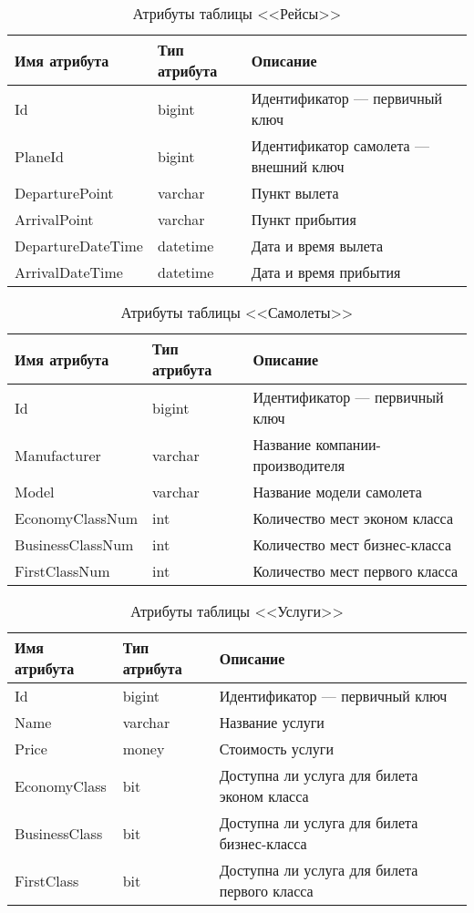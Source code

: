 \documentclass{bmstu}
\begin{document}
\begin{table}[H]
\caption{Атрибуты таблицы <<Рейсы>>}
\label{tabular:flights}
\begin{tabular}{|>{\raggedleft}p{4cm}|>{\raggedleft}p{3cm}|>{\raggedleft}p{8cm}|}
\hline
\textbf{Имя атрибута} & \textbf{Тип атрибута} & \textbf{Описание}
\tabularnewline
\hline
Id & bigint & Идентификатор --- первичный ключ
\tabularnewline
\hline
PlaneId & bigint & Идентификатор самолета --- внешний ключ
\tabularnewline
\hline
DeparturePoint & varchar & Пункт вылета
\tabularnewline
\hline
ArrivalPoint & varchar & Пункт прибытия
\tabularnewline
\hline
DepartureDateTime & datetime & Дата и время вылета
\tabularnewline
\hline
ArrivalDateTime & datetime & Дата и время прибытия
\tabularnewline
\hline
\end{tabular}
\end{table}

\begin{table}[H]
\caption{Атрибуты таблицы <<Самолеты>>}
\label{tabular:planes}
\begin{tabular}{|>{\raggedleft}p{4cm}|>{\raggedleft}p{3cm}|>{\raggedleft}p{8cm}|}
\hline
\textbf{Имя атрибута} & \textbf{Тип атрибута} & \textbf{Описание}
\tabularnewline
\hline
Id & bigint & Идентификатор --- первичный ключ
\tabularnewline
\hline
Manufacturer & varchar & Название компании-производителя
\tabularnewline
\hline
Model & varchar & Название модели самолета
\tabularnewline
\hline
EconomyClassNum & int & Количество мест эконом класса
\tabularnewline
\hline
BusinessClassNum & int & Количество мест бизнес-класса
\tabularnewline
\hline
FirstClassNum & int & Количество мест первого класса
\tabularnewline
\hline
\end{tabular}
\end{table}

\begin{table}[H]
\caption{Атрибуты таблицы <<Услуги>>}
\label{tabular:services}
\begin{tabular}{|>{\raggedleft}p{4cm}|>{\raggedleft}p{3cm}|>{\raggedleft}p{8cm}|}
\hline
\textbf{Имя атрибута} & \textbf{Тип атрибута} & \textbf{Описание}
\tabularnewline
\hline
Id & bigint & Идентификатор --- первичный ключ
\tabularnewline
\hline
Name & varchar & Название услуги
\tabularnewline
\hline
Price & money & Стоимость услуги
\tabularnewline
\hline
EconomyClass & bit & Доступна ли услуга для билета эконом класса
\tabularnewline
\hline
BusinessClass & bit & Доступна ли услуга для билета бизнес-класса
\tabularnewline
\hline
FirstClass & bit & Доступна ли услуга для билета первого класса
\tabularnewline
\hline
\end{tabular}
\end{table}
\end{document}
